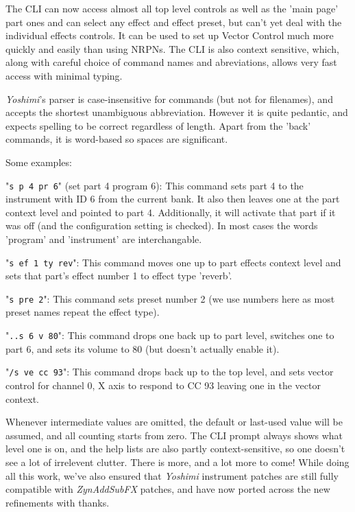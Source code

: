 \documentclass[
 11pt,
 twoside,
 a4paper,
 final                                 %
]{article}
\begin{document}
   The CLI can now access almost all top level controls as well as the 'main
   page' part ones and can select any effect and effect preset, but can't yet
   deal with the individual effects controls. It can be used to set up Vector
   Control much more quickly and easily than using NRPNs.  The CLI is also
   context sensitive, which, along with careful choice of command names and
   abreviations, allows very fast access with minimal typing.

   \textsl{Yoshimi}'s parser is case-insensitive for commands (but not for
   filenames), and accepts the shortest unambiguous abbreviation. However it is
   quite pedantic, and expects spelling to be correct regardless of length.
   Apart from the 'back' commands, it is word-based so spaces are significant.

   Some examples:

   "\texttt{s p 4 pr 6}" (set part 4 program 6):
   This command sets part 4 to the instrument with ID 6 from the current bank.
   It also then leaves one at the part context level and pointed to part 4.
   Additionally, it will activate that part if it was off (and the
   configuration setting is checked). In most cases the words 'program' and
   'instrument' are interchangable.

   "\texttt{s ef 1 ty rev}":
   This command moves one up to part effects context level and sets that part's
   effect number 1 to effect type 'reverb'.

   "\texttt{s pre 2}":
   This command sets preset number 2 (we use numbers here as most preset names
   repeat the effect type).

   "\texttt{..s 6 v 80}":
   This command drops one back up to part level, switches one to part 6, and
   sets its volume to 80 (but doesn't actually enable it).

   "\texttt{/s ve cc 93}":
   This command drops back up to the top level, and sets vector control for
   channel 0, X axis to respond to CC 93 leaving one in the vector context.

   Whenever intermediate values are omitted, the default or last-used value
   will be assumed, and all counting starts from zero.  The CLI prompt always
   shows what level one is on, and the help lists are also partly
   context-sensitive, so one doesn't see a lot of irrelevent clutter.  There is
   more, and a lot more to come!  While doing all this work, we've also ensured
   that \textsl{Yoshimi} instrument patches are still fully compatible with
   \textsl{ZynAddSubFX} patches, and have now ported across the new refinements
   with thanks.
\end{document}

